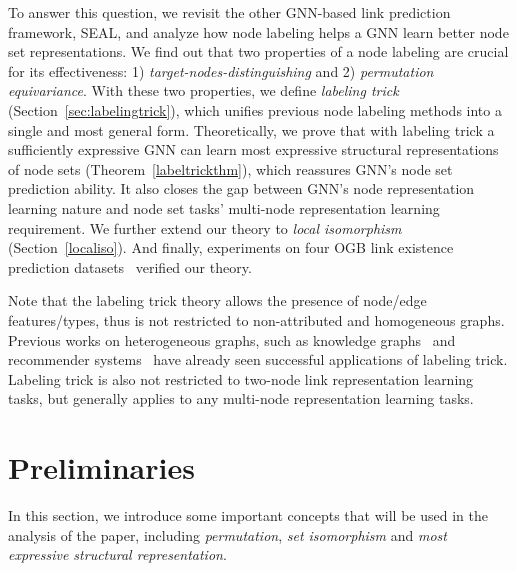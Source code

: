 \documentclass{article}
\begin{document}
To answer this question, we revisit the other GNN-based link prediction framework, SEAL, and analyze how node labeling helps a GNN learn better node set representations. We find out that two properties of a node labeling are crucial for its effectiveness: 1) \textit{target-nodes-distinguishing} and 2) \textit{permutation equivariance}. With these two properties, we define \textit{labeling trick} (Section~\ref{sec:labelingtrick}), which unifies previous node labeling methods into a single and most general form. 
Theoretically, we prove that with labeling trick a sufficiently expressive GNN can learn most expressive structural representations of node sets (Theorem~\ref{labeltrickthm}), which reassures GNN's node set prediction ability. It also closes the gap between GNN's node representation learning nature and node set tasks' multi-node representation learning requirement. We further extend our theory to \textit{local isomorphism} (Section~\ref{localiso}).
And finally, experiments on four OGB link existence prediction datasets~\citep{hu2020open} verified our theory.
















Note that the labeling trick theory allows the presence of node/edge features/types, thus is not restricted to non-attributed and homogeneous graphs. Previous works on heterogeneous graphs, such as knowledge graphs~\citep{teru2020inductive} and recommender systems~\citep{Zhang2020Inductive} have already seen successful applications of labeling trick. Labeling trick is also not restricted to two-node link representation learning tasks, but generally applies to any multi-node representation learning tasks.


















\section{Preliminaries}
In this section, we introduce some important concepts that will be used in the analysis of the paper, including \textit{permutation}, \textit{set isomorphism} and \textit{most expressive structural representation}.
\end{document}
